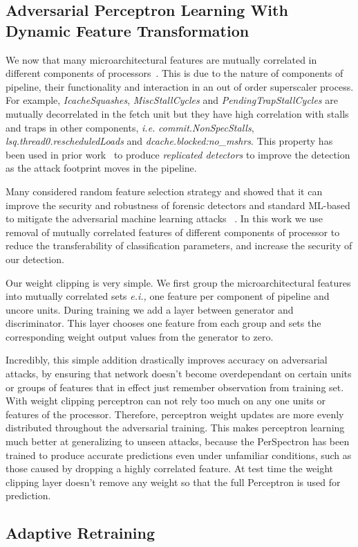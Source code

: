 
 
\subsection{Adversarial Perceptron Learning With Dynamic Feature Transformation}
We now that many microarchitectural features are mutually correlated in different components of processors~\cite{PerSpectron}. This is due to the nature of components of pipeline, their functionality and interaction in an out of order superscaler process. For example, \textit{IcacheSquashes}, \textit{MiscStallCycles} and \textit{PendingTrapStallCycles} 
are mutually decorrelated in the fetch unit but they have high correlation with stalls 
and traps in other components, {\em i.e.} \textit{commit.NonSpecStalls}, 
\textit{lsq.thread0.rescheduledLoads} and \textit{dcache.blocked:no\_mshrs}. This property has been used in prior work~\cite{PerSpectron} to produce {\em replicated detectors} to improve the detection as the attack footprint moves in the pipeline.


Many considered random feature selection
strategy and showed that it can improve the security and robustness of forensic detectors and
standard ML-based to mitigate the adversarial machine learning attacks ~\cite{nowroozi2020survey, secureDetection2019}.
 In this work we use removal of mutually correlated features of different components of processor to reduce the transferability of classification parameters, and increase the security of our 
detection. 

Our weight clipping is very simple. We first group the microarchitectural features into mutually correlated sets {\em e.i.,} one feature per component of pipeline and uncore units. During training we add a layer between generator and discriminator. This layer chooses one feature from each group and sets the corresponding weight output values from the generator to zero.

Incredibly, this simple addition drastically improves accuracy on adversarial attacks, by ensuring that network doesn't become overdependant on certain units or groups of features that in effect just remember observation from training set. With weight clipping perceptron can not rely too much on any one units or features of the processor. Therefore, perceptron weight updates are more evenly distributed throughout the adversarial training. This makes perceptron learning much better at generalizing to unseen attacks, because the PerSpectron has been trained to produce accurate predictions even under unfamiliar conditions, such as those caused by dropping a highly correlated feature. At test time the weight clipping layer doesn't remove any weight so that the full Perceptron is used for prediction. 
\subsection{Adaptive Retraining}
